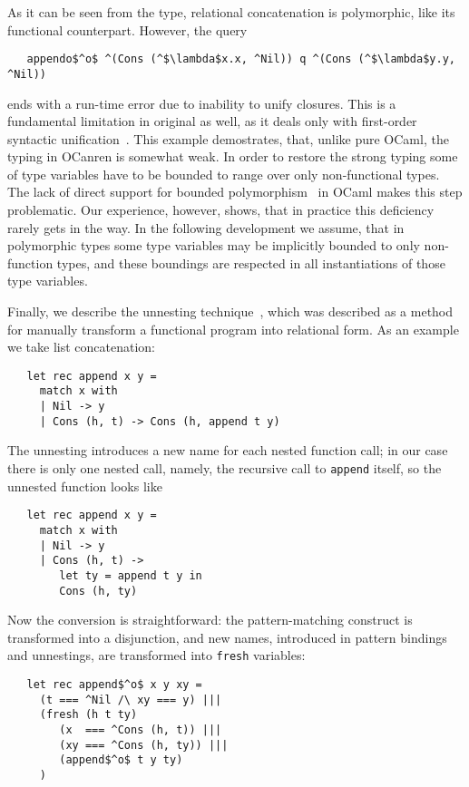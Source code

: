 As it can be seen from the type, relational concatenation is polymorphic, like its functional counterpart. However, the query

\begin{lstlisting}
   appendo$^o$ ^(Cons (^$\lambda$x.x, ^Nil)) q ^(Cons (^$\lambda$y.y, ^Nil))  
\end{lstlisting}

\noindent ends with a run-time error due to inability to unify closures. This is a fundamental limitation in original \miniKanren as well, as it deals only with first-order syntactic unification~\cite{Unification}. This example demostrates, that, unlike pure OCaml, the typing in OCanren is somewhat weak. In order to restore the strong typing some of type variables have to be bounded to range over only non-functional types. The lack of direct support for bounded polymorphism~\cite{cardelli} in OCaml makes this step problematic. Our experience, however, shows, that in practice this deficiency rarely gets in the way. In the following development we assume, that in polymorphic types some type variables may be implicitly bounded to only non-function types, and these boundings are respected in all instantiations of those type variables.

Finally, we describe the unnesting technique~\cite{TRS}, which was described as a method for manually transform
a functional program into relational form. As an example we take list concatenation:

\begin{lstlisting}
   let rec append x y =
     match x with
     | Nil -> y
     | Cons (h, t) -> Cons (h, append t y)
\end{lstlisting}

The unnesting introduces a new name for each nested function call; in our case there is only one nested call, namely,
the recursive call to \lstinline|append| itself, so the unnested function looks like

\begin{lstlisting}
   let rec append x y =
     match x with 
     | Nil -> y
     | Cons (h, t) -> 
        let ty = append t y in
        Cons (h, ty)
\end{lstlisting}

Now the conversion is straightforward: the pattern-matching construct is transformed into a disjunction, and new names,
introduced in pattern bindings and unnestings, are transformed into \lstinline|fresh| variables:

\begin{lstlisting}
   let rec append$^o$ x y xy =
     (t === ^Nil /\ xy === y) |||
     (fresh (h t ty)
        (x  === ^Cons (h, t)) |||
        (xy === ^Cons (h, ty)) |||
        (append$^o$ t y ty)
     )
\end{lstlisting}

